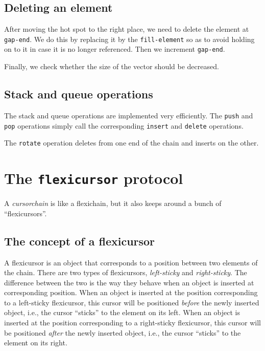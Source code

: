 \documentclass[11pt]{article}
\begin{document}
\subsection{Deleting an element}

After moving the hot spot to the right place, we need to delete the
element at \texttt{gap-end}.  We do this by replacing it by the
\texttt{fill-element} so as to avoid holding on to it in case it is no
longer referenced.  Then we increment \texttt{gap-end}.

Finally, we check whether the size of the vector should be decreased.

\subsection{Stack and queue operations}

The stack and queue operations are implemented very efficiently.  The
\texttt{push} and \texttt{pop} operations simply call the
corresponding \texttt{insert} and \texttt{delete} operations.

The \texttt{rotate} operation deletes from one end of the chain and
inserts on the other.

\section{The \texttt{flexicursor} protocol}

A \textit{cursorchain} is like a flexichain, but it also keeps around
a bunch of ``flexicursors''.

\subsection{The concept of a flexicursor}

A flexicursor is an object that corresponds to a position between two
elements of the chain.  There are two types of flexicursors,
\emph{left-sticky} and \emph{right-sticky}.  The difference between
the two is the way they behave when an object is inserted at
corresponding position. When an object is inserted at the position
corresponding to a left-sticky flexicursor, this cursor will be
positioned \emph{before} the newly inserted object, i.e., the cursor
``sticks'' to the element on its left.  When an object is inserted at
the position corresponding to a right-sticky flexicursor, this cursor
will be positioned \emph{after} the newly inserted object, i.e., the
cursor ``sticks'' to the element on its right.
\end{document}
